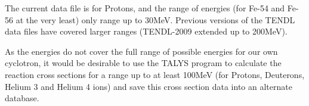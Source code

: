 \documentclass[12pt,twoside]{manual}
\begin{document}
The current data file is for Protons, and the range of energies (for Fe-54 and Fe-56 at the very least) only range up to 30MeV.  Previous versions of the TENDL data files have covered larger ranges (TENDL-2009 extended up to 200MeV).

As the energies do not cover the full range of possible energies for our own cyclotron, it would be desirable to use the TALYS program to calculate the reaction cross sections for a range up to at least 100MeV (for Protons, Deuterons, Helium 3 and Helium 4 ions) and save this cross section data into an alternate database.







\printbibliography
\end{document}
